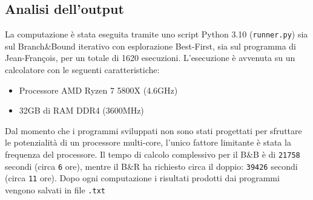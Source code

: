 \documentclass[
    article,            %
    12pt,                %
    oneside,            %
    a4paper,            %
    english,            %
    italian,                %
    sumario=tradicional,
]{abntex2}
\begin{document}
\subsection{Analisi dell'output}

La computazione è stata eseguita tramite uno script Python 3.10 (\texttt{runner.py}) sia sul Branch\&Bound iterativo con esplorazione Best-First, sia sul programma di Jean-François, per un totale di 1620 esecuzioni.
L'esecuzione è avvenuta su un calcolatore con le seguenti caratteristiche:
    \begin{itemize}
        \item Processore AMD Ryzen 7 5800X (4.6GHz)
        \item 32GB di RAM DDR4 (3600MHz)
    \end{itemize}
Dal momento che i programmi sviluppati non sono stati progettati per sfruttare le potenzialità di un processore multi-core, l'unico fattore limitante è stata la frequenza del processore.
\newline
Il tempo di calcolo complessivo per il B\&B è di \texttt{21758} secondi (circa \texttt{6} ore), mentre il B\&R ha richiesto circa il doppio: \texttt{39426} secondi (circa \texttt{11} ore). Dopo ogni computazione i risultati prodotti dai programmi vengono salvati in file \texttt{.txt}
\end{document}
